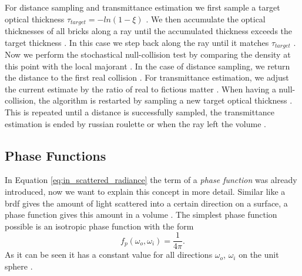 For distance sampling and transmittance estimation we first sample a target optical thickness $\tau_{target}=-ln(1-\xi)$ \cite{brick_grid}.
We then accumulate the optical thicknesses of all bricks along a ray until the accumulated thickness exceeds the target thickness \cite{brick_grid}.
In this case we step back along the ray until it matches $\tau_{target}$ \cite{brick_grid}.
Now we perform the stochastical null-collision test by comparing the density at this point with the local majorant \cite{brick_grid}.
In the case of distance sampling, we return the distance to the first real collision \cite{brick_grid}.
For transmittance estimation, we adjust the current estimate by the ratio of real to fictious matter \cite{brick_grid}.
When having a null-collision, the algorithm is restarted by sampling a new target optical thickness \cite{brick_grid}.
This is repeated until a distance is successfully sampled, the transmittance estimation is ended by russian roulette or when the ray left the volume \cite{brick_grid}.

\subsection{Phase Functions}
\label{subsec:phase_function}
In Equation \ref{eq:in_scattered_radiance} the term of a \textit{phase function} was already introduced, now we want to explain this concept in more detail.
Similar like a \acs{brdf} gives the amount of light scattered into a certain direction on a surface, a phase function gives this amount in a volume \cite{novak_overview}.
The simplest phase function possible is an isotropic phase function with the form
\begin{equation*}
    f_p(\omega_o, \omega_i)=\frac{1}{4\pi}.
\end{equation*}
As it can be seen it has a constant value for all directions $\omega_o$, $\omega_i$ on the unit sphere \cite{novak_overview}.

